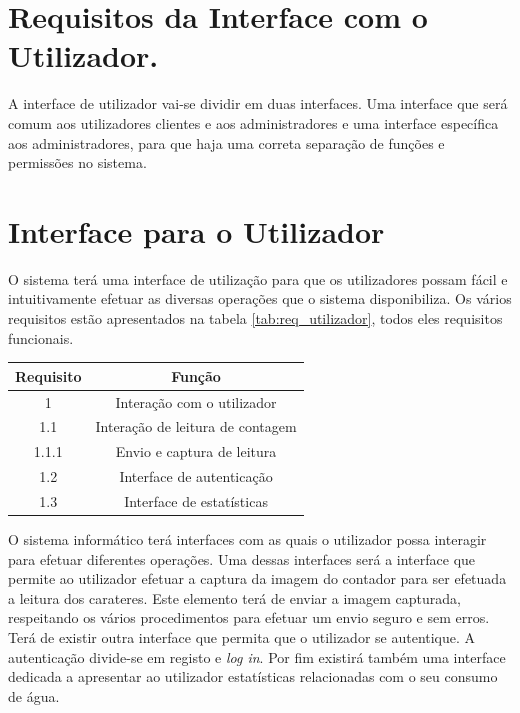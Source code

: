 \section{Requisitos da Interface com o Utilizador.} \label{sec:req_ut}
A interface de utilizador vai-se dividir em duas interfaces. Uma interface que será comum aos utilizadores clientes e aos administradores e uma interface específica aos administradores, para que haja uma correta separação de funções e permissões no sistema. 

\section{Interface para o Utilizador} \label{sec:req_ut2}
O sistema terá uma interface de utilização para que os utilizadores possam fácil e intuitivamente efetuar as diversas operações que o sistema disponibiliza. Os vários requisitos estão apresentados na tabela \ref{tab:req_utilizador}, todos eles requisitos funcionais.

\begin{center}
\begin{tabular}[c]{||c  c ||}  %
\hline
Requisito & Função\\
\hline
1 & Interação com o utilizador\\ 

1.1 & Interação de leitura de contagem\\

1.1.1 & Envio e captura de leitura\\

1.2 & Interface de autenticação\\

1.3 & Interface de estatísticas\\
\hline
\end{tabular}
\label{tab:req_utilizador}
\end{center}
\vspace{8mm} %

O sistema informático terá interfaces com as quais o utilizador possa interagir para efetuar diferentes operações. Uma dessas interfaces será a interface que permite ao utilizador efetuar a captura da imagem do contador para ser efetuada a leitura dos carateres. Este elemento terá de enviar a imagem capturada, respeitando os vários procedimentos para efetuar um envio seguro e sem erros.\\
Terá de existir outra interface que permita que o utilizador se autentique. A autenticação divide-se em registo e {\textit{log in}}. Por fim existirá também uma interface dedicada a apresentar ao utilizador estatísticas relacionadas com o seu consumo de água.


